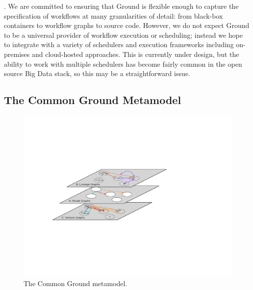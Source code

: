 \documentclass{sig-alternate}
\begin{document}
. 
We are committed to ensuring that Ground is flexible enough to capture the specification of workflows at many granularities of detail: from black-box containers to workflow graphs to source code.  
However, we do not expect Ground to be a universal provider of workflow execution or scheduling; instead we hope to integrate with a variety of schedulers and execution frameworks including on-premises and cloud-hosted approaches. 
This is currently under design, but the ability to work with multiple schedulers has become fairly common in the open source Big Data stack, so this may be a straightforward issue.

\smallitembot

\subsection{The Common Ground Metamodel}
\label{sec:metamodel}

\begin{figure}[th]
\centering
\includegraphics[width=\linewidth]{layers.pdf}
\caption{The Common Ground metamodel.} 
\label{fig:layers}
\end{figure}
\end{document}
